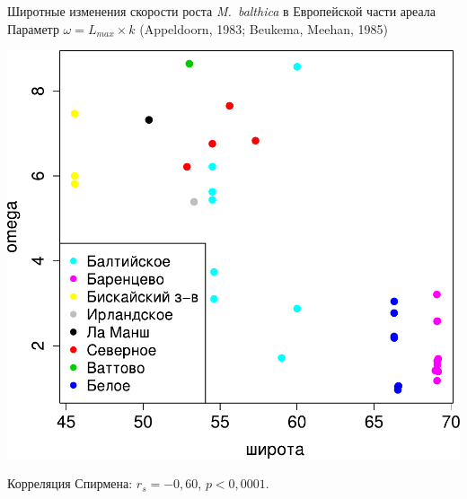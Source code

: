 \documentclass{beamer}
\begin{document}
\begin{frame}{Широтные изменения скорости роста {\it M.~balthica} в Европейской части ареала}
{\footnotesize Параметр $\omega = L_{max} \times k$ (Appeldoorn, 1983; Beukema, Meehan, 1985)}
		\begin{center}
			\includegraphics[height=.62\textheight]{./long_vs_omega_big2.pdf}
		\end{center}
{\small Корреляция Спирмена: $r_{s} = -0,60$, $p < 0,0001$.}

\end{frame}
\end{document}
